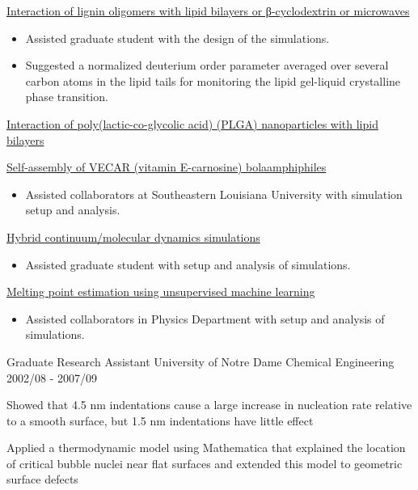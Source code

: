 \begin{cventries}
{\begin{cvitems}
\begin{itemize}
            \end{itemize}
        \item {\underline{Interaction of lignin oligomers with lipid bilayers or β-cyclodextrin or microwaves}}
            \begin{itemize}
            \item {Assisted graduate student with the design of the simulations.}
            \item {Suggested a normalized deuterium order parameter averaged over several carbon atoms in the lipid tails for monitoring the lipid gel-liquid crystalline phase transition.}
            \end{itemize}            
        \item {\underline{Interaction of poly(lactic-co-glycolic acid) (PLGA) nanoparticles with lipid bilayers}}
        \item {\underline{Self-assembly of VECAR (vitamin E-carnosine) bolaamphiphiles}}
            \begin{itemize}
            \item {Assisted collaborators at Southeastern Louisiana University with simulation setup and analysis.}
            \end{itemize}
        \item {\underline{Hybrid continuum/molecular dynamics simulations}}
            \begin{itemize}
            \item {Assisted graduate student with setup and analysis of simulations.}
            \end{itemize}
        \item {\underline{Melting point estimation using unsupervised machine learning}}
            \begin{itemize}
            \item {Assisted collaborators in Physics Department with setup and analysis of simulations.}
            \end{itemize}      \end{cvitems}
    }
    
  \cventry
    {Graduate Research Assistant} %
    {University of Notre Dame} %
    {Chemical Engineering} %
    {2002/08 - 2007/09} %
    {
      \begin{cvitems} %
        \item {Showed that 4.5 nm indentations cause a large increase in nucleation rate relative to a smooth surface, but 1.5 nm indentations have little effect
        \item {Applied a thermodynamic model using Mathematica that explained the location of critical bubble nuclei near flat surfaces and extended this model to geometric surface defects}
}
      \end{cvitems}
    }
    

\end{cventries}
